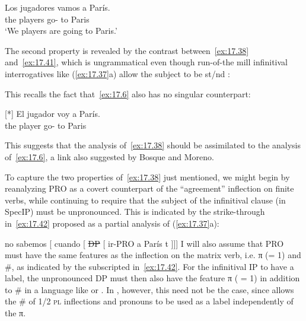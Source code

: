 \documentclass[output=paper]{langsci/langscibook}
\begin{document}
\begin{exe}
\exi{\eqref{ex:17.6}}
    \gll    Los jugadores vamos a París.\\
            the players      go-\Fpl{} to Paris\\
    \glt    ‘We players are going to Paris.’\\
\end{exe}
The second property is revealed by the contrast between~\eqref{ex:17.38}
and~\eqref{ex:17.41}, which is ungrammatical even though run-of-the mill
infinitival interrogatives like (\ref{ex:17.37}a) allow the subject to be
\First{}st/\Second{}nd \Sg:

\label{ex:17.41}
\z
This recalls the fact that~\eqref{ex:17.6} also has no singular counterpart:

\begin{exe}
\exi{\eqref{ex:17.19}}[*]{%
    \gll El jugador voy a París.\\
        the player go-\Fsg{} to Paris\\
    \glt}
\end{exe}
This suggests that the analysis of~\eqref{ex:17.38} should be assimilated to the
analysis of~\eqref{ex:17.6}, a link also suggested by Bosque and Moreno.

To capture the two properties of~\eqref{ex:17.38} just mentioned, we might
begin by reanalyzing PRO as a covert counterpart of the “agreement” inflection
on finite verbs, while continuing to require that the subject of the
infinitival clause (in SpecIP) must be unpronounced. This is indicated by the
strike-through in~\eqref{ex:17.42} proposed as a partial analysis of
(\ref{ex:17.37}a):

\ea\label{ex:17.42}
    no sabemos\tss{\Fpl} [ cuando [ \sout{DP} [ ir-PRO\tss{\Fpl} a París t ]]]
\z
I will also assume that PRO must have the same features as the
inflection on the matrix verb, i.e. π (= 1) and \#, as indicated by the
subscripted \Fpl{} in~\eqref{ex:17.42}. For the infinitival IP to have a
label, the unpronounced DP must then also have the feature π ( = 1) in addition
to \# in a language like  or . In ,
however, this need not be the case, since  allows the \# of 1/2
\textsc{pl} inflections and pronouns to be used as a label independently of the
π.
\end{document}
